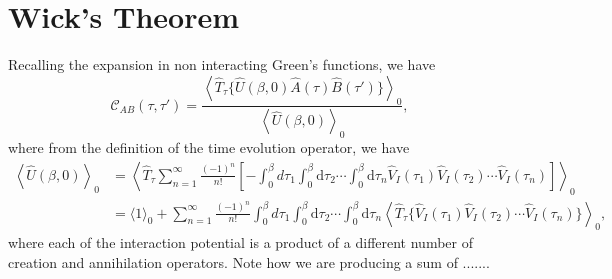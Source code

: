 \section{Wick's Theorem}

Recalling the expansion in non interacting Green's functions, we have
\[
    \mathcal{C}_{AB}(\tau, \tau') = \frac{\left\langle \hat{T}_{\tau} \{\hat{U}(\beta, 0)\hat{A}(\tau) \hat{B}(\tau')\} \right\rangle_0}{\left\langle \hat{U}(\beta, 0) \right\rangle_0},
\]
where from the definition of the time evolution operator, we have
\[
    \begin{aligned}
        \left\langle \hat{U}(\beta, 0) \right\rangle_0 & = \left\langle \hat{T}_{\tau} \sum_{n=1}^{\infty} \frac{(-1)^n}{n!} \left[ -\int_0^{\beta} d\tau_1 \int_0^{\beta}\mathrm{d}\tau_2 \cdots \int_0^{\beta} \mathrm{d}\tau_n \hat{V}_I(\tau_1) \hat{V}_I(\tau_2) \cdots \hat{V}_I(\tau_n) \right] \right\rangle_0            \\
                                                       & = \langle 1 \rangle_0 + \sum_{n=1}^{\infty} \frac{(-1)^n}{n!} \int_0^{\beta} d\tau_1 \int_0^{\beta}\mathrm{d}\tau_2 \cdots \int_0^{\beta} \mathrm{d}\tau_n \left\langle \hat{T}_{\tau} \{\hat{V}_I(\tau_1) \hat{V}_I(\tau_2) \cdots \hat{V}_I(\tau_n)\} \right\rangle_0,
    \end{aligned}
\]
where each of the interaction potential is a product of a different number of creation and annihilation operators. Note how we are producing a sum of .......

